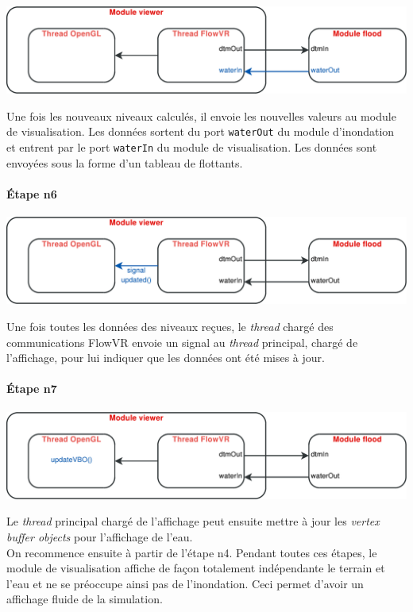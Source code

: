 \documentclass[a4paper, 12pt]{article}
\begin{document}
\begin{center}
\includegraphics[scale=0.4]{include/schemas/5.pdf}
\end{center}

Une fois les nouveaux niveaux calculés, il envoie les nouvelles valeurs au
module de visualisation. Les données sortent du port \texttt{waterOut} du module
d'inondation et entrent par le port \texttt{waterIn} du module de visualisation.
Les données sont envoyées sous la forme d'un tableau de flottants.

\paragraph*{Étape n6}

\begin{center}
\includegraphics[scale=0.4]{include/schemas/6.pdf}
\end{center}

Une fois toutes les données des niveaux reçues, le \textit{thread} chargé des
communications FlowVR envoie un signal au \textit{thread} principal,
chargé de l'affichage, pour lui indiquer que les données ont été mises à jour.

\paragraph*{Étape n7}
\begin{center}
\includegraphics[scale=0.4]{include/schemas/7.pdf}
\end{center}

Le \textit{thread} principal chargé de l'affichage peut ensuite mettre à jour
les \textit{vertex buffer objects} pour l'affichage de l'eau. \\

On recommence ensuite à partir de l'étape n4. Pendant toutes ces étapes,
le module de visualisation affiche de façon totalement indépendante le terrain
et l'eau et ne se préoccupe ainsi pas de l'inondation. Ceci permet d'avoir un
affichage fluide de la simulation.
\end{document}
